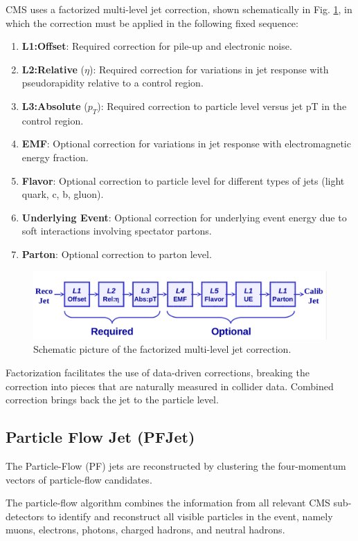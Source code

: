 CMS uses a factorized multi-level jet correction, shown schematically in Fig. \ref{jet3figure}, in
which the correction must be applied in the following fixed sequence:
\begin{enumerate}
\item 
\textbf{L1:Offset}: Required correction for pile-up and electronic noise.
\item
\textbf{L2:Relative} ($\eta$): Required correction for variations in jet response with pseudorapidity relative to a control region.
\item
\textbf{L3:Absolute} ($p_{T}$): Required correction to particle level versus jet pT in the control region.
\item
\textbf{EMF}: Optional correction for variations in jet response with electromagnetic energy fraction.
\item
\textbf{Flavor}: Optional correction to particle level for different types of jets (light quark, c, b, gluon).
\item
\textbf{Underlying Event}: Optional correction for underlying event energy due to soft interactions involving spectator partons.
\item
\textbf{Parton}: Optional correction to parton level.
\end{enumerate}
\begin{figure}[H]
  \centering
\includegraphics[width=13cm]{physics_objects_plots/jetcorr2}
\caption{Schematic picture of the factorized multi-level jet correction. \label{jet3figure}}
\end{figure}
Factorization facilitates the use of data-driven corrections, breaking the correction into pieces that are naturally measured in collider data. Combined correction brings back the jet to the particle level.

\subsection{Particle Flow Jet (PFJet)}

The Particle-Flow (PF) jets \cite{pfjet} are reconstructed by clustering the four-momentum vectors of particle-flow candidates. 

The particle-flow algorithm combines the information from all
relevant CMS sub-detectors to identify and reconstruct all visible particles in the event, namely muons, electrons, photons, charged hadrons, and neutral hadrons.

